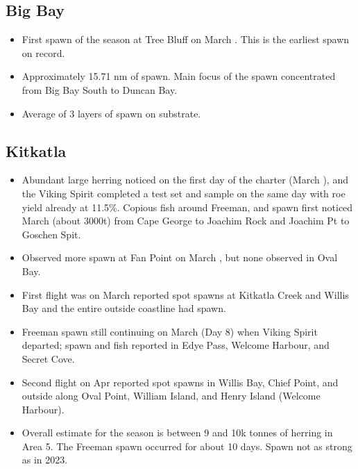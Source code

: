 \subsection{Big Bay}

\begin{itemize}

\item First spawn of the season at Tree Bluff on March .
This is the earliest spawn on record.

\item Approximately 15.71 nm of spawn.
Main focus of the spawn concentrated from Big Bay South to Duncan Bay.

\item Average of 3 layers of spawn on substrate.

\end{itemize}

\subsection{Kitkatla}

\begin{itemize}

\item Abundant large herring noticed on the first day of the charter
(March ), and the Viking Spirit completed a test set and sample
on the same day with roe yield already at 11.5\%.
Copious fish around Freeman, and spawn first noticed March 
(about 3000t) from Cape George to Joachim Rock and Joachim Pt to Goschen Spit.

\item Observed more spawn at Fan Point on March ,
but none observed in Oval Bay.

\item First flight was on March  reported spot spawns at
Kitkatla Creek and Willis Bay and the entire outside coastline had spawn.

\item Freeman spawn still continuing on March  (Day 8)
when Viking Spirit departed;
spawn and fish reported in Edye Pass, Welcome Harbour, and Secret Cove.

\item Second flight on Apr  reported spot spawns in
Willis Bay, Chief Point, and outside along
Oval Point, William Island, and Henry Island (Welcome Harbour).

\item Overall estimate for the season is between 9 and 10k tonnes
of herring in Area 5.
The Freeman spawn occurred for about 10 days.
Spawn not as strong as in 2023.

\end{itemize}